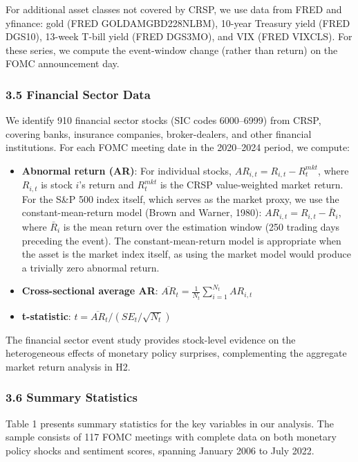 \documentclass[
]{article}
\begin{document}
For additional asset classes not covered by CRSP, we use data from FRED
and yfinance: gold (FRED GOLDAMGBD228NLBM), 10-year Treasury yield (FRED
DGS10), 13-week T-bill yield (FRED DGS3MO), and VIX (FRED VIXCLS). For
these series, we compute the event-window change (rather than return) on
the FOMC announcement day.

\subsubsection{3.5 Financial Sector Data}\label{financial-sector-data}

We identify 910 financial sector stocks (SIC codes 6000--6999) from
CRSP, covering banks, insurance companies, broker-dealers, and other
financial institutions. For each FOMC meeting date in the 2020--2024
period, we compute:

\begin{itemize}
\item
  \textbf{Abnormal return (AR)}: For individual stocks,
  \(AR_{i,t} = R_{i,t} - R^{mkt}_t\), where \(R_{i,t}\) is stock \(i\)'s
  return and \(R^{mkt}_t\) is the CRSP value-weighted market return. For
  the S\&P 500 index itself, which serves as the market proxy, we use
  the constant-mean-return model (Brown and Warner, 1980):
  \(AR_{i,t} = R_{i,t} - \bar{R}_i\), where \(\bar{R}_i\) is the mean
  return over the estimation window (250 trading days preceding the
  event). The constant-mean-return model is appropriate when the asset
  is the market index itself, as using the market model would produce a
  trivially zero abnormal return.
\item
  \textbf{Cross-sectional average AR}:
  \(\overline{AR}_t = \frac{1}{N_t} \sum_{i=1}^{N_t} AR_{i,t}\)
\item
  \textbf{t-statistic}: \(t = \overline{AR}_t / (SE_t / \sqrt{N_t})\)
\end{itemize}

The financial sector event study provides stock-level evidence on the
heterogeneous effects of monetary policy surprises, complementing the
aggregate market return analysis in H2.

\subsubsection{3.6 Summary Statistics}\label{summary-statistics}

Table 1 presents summary statistics for the key variables in our
analysis. The sample consists of 117 FOMC meetings with complete data on
both monetary policy shocks and sentiment scores, spanning January 2006
to July 2022.
\end{document}
